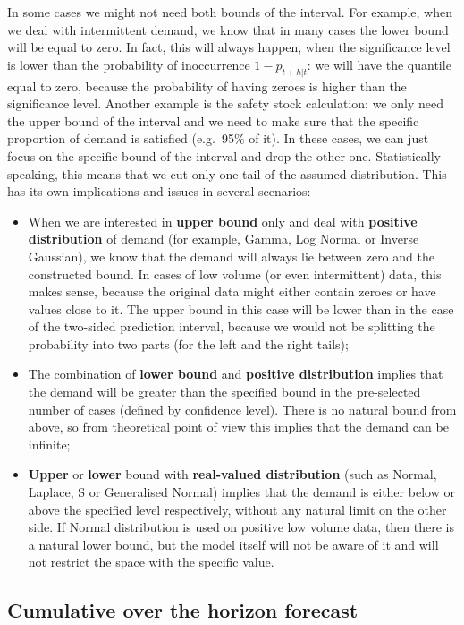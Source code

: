 \documentclass[
]{book}
\providecommand{\tightlist}{%
  \setlength{\itemsep}{0pt}\setlength{\parskip}{0pt}}
\theoremstyle{definition}
\theoremstyle{definition}
\theoremstyle{definition}
\theoremstyle{definition}
\theoremstyle{remark}
\begin{document}
In some cases we might not need both bounds of the interval. For example, when we deal with intermittent demand, we know that in many cases the lower bound will be equal to zero. In fact, this will always happen, when the significance level is lower than the probability of inoccurrence \(1-p_{t+h|t}\): we will have the quantile equal to zero, because the probability of having zeroes is higher than the significance level. Another example is the safety stock calculation: we only need the upper bound of the interval and we need to make sure that the specific proportion of demand is satisfied (e.g.~95\% of it). In these cases, we can just focus on the specific bound of the interval and drop the other one. Statistically speaking, this means that we cut only one tail of the assumed distribution. This has its own implications and issues in several scenarios:

\begin{itemize}
\tightlist
\item
  When we are interested in \textbf{upper bound} only and deal with \textbf{positive distribution} of demand (for example, Gamma, Log Normal or Inverse Gaussian), we know that the demand will always lie between zero and the constructed bound. In cases of low volume (or even intermittent) data, this makes sense, because the original data might either contain zeroes or have values close to it. The upper bound in this case will be lower than in the case of the two-sided prediction interval, because we would not be splitting the probability into two parts (for the left and the right tails);
\item
  The combination of \textbf{lower bound} and \textbf{positive distribution} implies that the demand will be greater than the specified bound in the pre-selected number of cases (defined by confidence level). There is no natural bound from above, so from theoretical point of view this implies that the demand can be infinite;
\item
  \textbf{Upper} or \textbf{lower} bound with \textbf{real-valued distribution} (such as Normal, Laplace, S or Generalised Normal) implies that the demand is either below or above the specified level respectively, without any natural limit on the other side. If Normal distribution is used on positive low volume data, then there is a natural lower bound, but the model itself will not be aware of it and will not restrict the space with the specific value.
\end{itemize}

\hypertarget{forecastingADAMOtherCumulative}{%
\subsection{Cumulative over the horizon forecast}\label{forecastingADAMOtherCumulative}}
\end{document}
